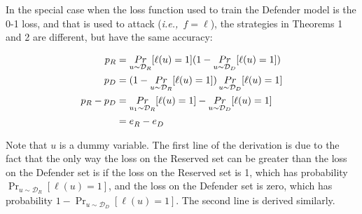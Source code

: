 \documentclass[letterpaper]{article}
\newcommand{\ie}{{\em i.e.,~}}
\begin{document}
In the special case when the loss function used to train the Defender model is the 0-1 loss, and that is used to attack (\ie $f=\ell$), the strategies in Theorems 1 and 2 are different, but have the same accuracy:

\begin{align}
p_R &= \mathop{Pr}_{u \sim \mathcal{D}_R }[\ell(u)=1] (1-\mathop{Pr}_{u \sim \mathcal{D}_D }[\ell(u)=1]) \notag \\
p_D &= (1-\mathop{Pr}_{u \sim \mathcal{D}_R }[\ell(u)=1]) \mathop{Pr}_{u \sim \mathcal{D}_D }[\ell(u)=1] \notag \\
p_R - p_D &= \mathop{Pr}_{u_1 \sim \mathcal{D}_R }[\ell(u)=1] - \mathop{Pr}_{u \sim \mathcal{D}_D }[\ell(u)=1] \notag \\
&= e^{}_R - e^{}_D \notag
\end{align}

Note that $u$ is a dummy variable. The first line of the derivation is due to the fact that the only way the loss on the Reserved set can be greater than the loss on the Defender set is if the loss on the Reserved set is 1, which has probability $\mathop{Pr}_{u \sim \mathcal{D}_R }[\ell(u)=1]$, and the loss on the Defender set is zero, which has probability $1-\mathop{Pr}_{u \sim \mathcal{D}_D }[\ell(u)=1]$. The second line is derived similarly.
\end{document}
